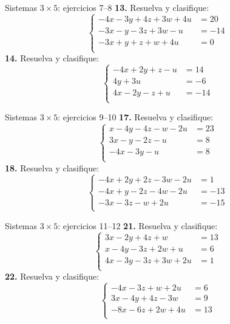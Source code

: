 \documentclass[aspectratio=169,9pt]{beamer}
\theoremstyle{remark}
\begin{document}
\begin{frame}{Sistemas $3\times 5$: ejercicios 7--8}
\scriptsize
\textbf{13.} Resuelva y clasifique:
\[\left\{\begin{aligned}
-4x-3y+4z+3w+4u&=20\\
-3x-y-3z+3w-u&=-14\\
-3x+y+z+w+4u&=0\\
\end{aligned}\right.\]
\textbf{14.} Resuelva y clasifique:
\[\left\{\begin{aligned}
-4x+2y+z-u&=14\\
4y+3u&=-6\\
4x-2y-z+u&=-14\\
\end{aligned}\right.\]
\end{frame}
\begin{frame}{Sistemas $3\times 5$: ejercicios 9--10}
\scriptsize
\textbf{17.} Resuelva y clasifique:
\[\left\{\begin{aligned}
x-4y-4z-w-2u&=23\\
3x-y-2z-u&=8\\
-4x-3y-u&=8\\
\end{aligned}\right.\]
\textbf{18.} Resuelva y clasifique:
\[\left\{\begin{aligned}
-4x+2y+2z-3w-2u&=1\\
-4x+y-2z-4w-2u&=-13\\
-3x-3z-w+2u&=-15\\
\end{aligned}\right.\]
\end{frame}
\begin{frame}{Sistemas $3\times 5$: ejercicios 11--12}
\scriptsize
\textbf{21.} Resuelva y clasifique:
\[\left\{\begin{aligned}
3x-2y+4z+w&=13\\
x-4y-3z+2w+u&=6\\
4x-3y-3z+3w+2u&=1\\
\end{aligned}\right.\]
\textbf{22.} Resuelva y clasifique:
\[\left\{\begin{aligned}
-4x-3z+w+2u&=6\\
3x-4y+4z-3w&=9\\
-8x-6z+2w+4u&=13\\
\end{aligned}\right.\]
\end{frame}
\end{document}

